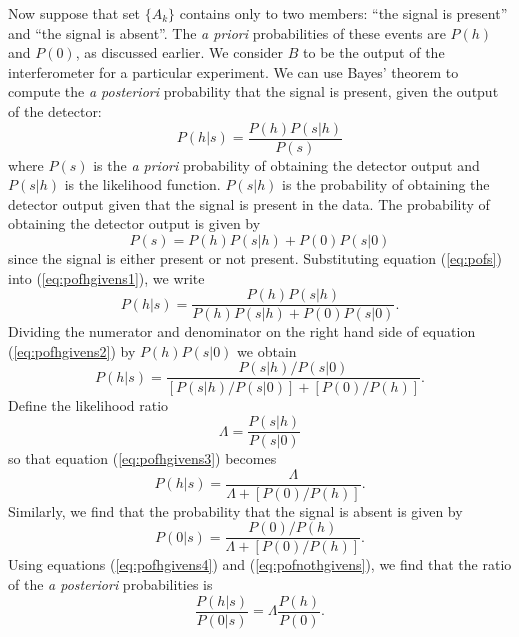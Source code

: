 Now suppose that set $\{A_k\}$ contains only to two members: ``the signal is
present'' and ``the signal is absent''. The \emph{a priori} probabilities of
these events are $P(h)$ and $P(0)$, as discussed earlier. We consider $B$ to
be the output of the interferometer for a particular experiment. We can
use Bayes' theorem to compute the \emph{a posteriori} probability that the
signal is present, given the output of the detector:
\begin{equation}
P(h|s) = \frac{P(h)P(s|h)}{P(s)}
\label{eq:pofhgivens1}
\end{equation}
where $P(s)$ is the \emph{a priori} probability of obtaining the detector
output and $P(s|h)$ is the likelihood function. $P(s|h)$ is the probability of
obtaining the detector output given that the signal is present in the data.
The probability of obtaining the detector output is given by
\begin{equation}
P(s) = P(h)P(s|h) + P(0)P(s|0)
\label{eq:pofs}
\end{equation}
since the signal is either present or not present.  Substituting equation
(\ref{eq:pofs}) into (\ref{eq:pofhgivens1}), we write
\begin{equation}
P(h|s) = \frac{P(h)P(s|h)}{P(h)P(s|h) + P(0)P(s|0)}.
\label{eq:pofhgivens2}
\end{equation}
Dividing the numerator and denominator on the right hand side of equation
(\ref{eq:pofhgivens2}) by $P(h)P(s|0)$ we obtain
\begin{equation}
P(h|s) = \frac{P(s|h)/P(s|0)}{[P(s|h)/P(s|0)] + [P(0)/P(h)]}.
\label{eq:pofhgivens3}
\end{equation}
Define the likelihood ratio
\begin{equation}
\Lambda = \frac{P(s|h)}{P(s|0)}
\label{eq:likelihooddef}
\end{equation}
so that equation (\ref{eq:pofhgivens3}) becomes
\begin{equation}
P(h|s) = \frac{\Lambda}{\Lambda + [P(0)/P(h)]}.
\label{eq:pofhgivens4}
\end{equation}
Similarly, we find that the probability that the signal is absent is given by
\begin{equation}
P(0|s) = \frac{P(0)/P(h)}{\Lambda + [P(0)/P(h)]}.
\label{eq:pofnothgivens}
\end{equation}
Using equations (\ref{eq:pofhgivens4}) and (\ref{eq:pofnothgivens}), we find
that the ratio of the \emph{a posteriori} probabilities is
\begin{equation}
\frac{P(h|s)}{P(0|s)} = \Lambda\frac{P(h)}{P(0)}.
\label{eq:postratio}
\end{equation}

